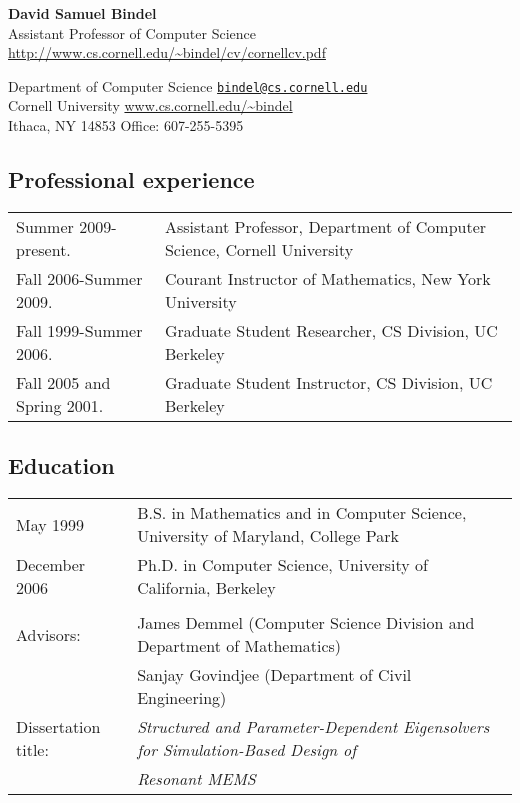 \documentclass{article}
\begin{document}
\begin{center}
  {\Large \bf David Samuel Bindel} \\
  Assistant Professor of Computer Science \\
  \url{http://www.cs.cornell.edu/~bindel/cv/cornellcv.pdf}
\end{center}

\begin{trivlist}
\item
Department of Computer Science
  \hfill \href{mail:bindel@cs.cornell.edu}{\tt bindel@cs.cornell.edu} \\
Cornell University
  \hfill \url{www.cs.cornell.edu/~bindel} \\
Ithaca, NY 14853
  \hfill Office: 607-255-5395
\end{trivlist}

\subsection*{Professional experience}

\begin{tabular}{ll}
  Summer 2009-present.
    & Assistant Professor, Department of Computer Science,
      Cornell University \\
  Fall 2006-Summer 2009.
    & Courant Instructor of Mathematics, New York University \\
  Fall 1999-Summer 2006.
    & Graduate Student Researcher, CS Division, UC Berkeley \\
  Fall 2005 and Spring 2001.
    & Graduate Student Instructor, CS Division, UC Berkeley
\end{tabular}

\subsection*{Education}

\begin{tabular}{ll}
May 1999 &
  B.S. in Mathematics and in Computer Science,
  University of Maryland, College Park \\
December 2006 &
  Ph.D. in Computer Science, University of California, Berkeley
\\
\\
Advisors:
 & James Demmel (Computer Science Division and Department of Mathematics) \\
 & Sanjay Govindjee (Department of Civil Engineering) \\
Dissertation title: &
   {\em Structured and Parameter-Dependent Eigensolvers for
        Simulation-Based Design of} \\
&  {\em Resonant MEMS}
\end{tabular}
\end{document}
